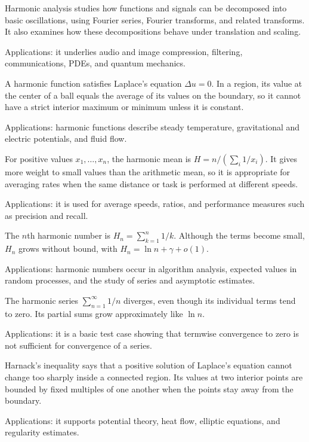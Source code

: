 Harmonic analysis studies how functions and signals can be decomposed into basic oscillations, using Fourier series, Fourier transforms, and related transforms. It also examines how these decompositions behave under translation and scaling. \par\noindent Applications: it underlies audio and image compression, filtering, communications, PDEs, and quantum mechanics.

A harmonic function satisfies Laplace's equation $\Delta u=0$. In a region, its value at the center of a ball equals the average of its values on the boundary, so it cannot have a strict interior maximum or minimum unless it is constant. \par\noindent Applications: harmonic functions describe steady temperature, gravitational and electric potentials, and fluid flow.

For positive values $x_1,\ldots,x_n$, the harmonic mean is $H=n/(\sum_i1/x_i)$. It gives more weight to small values than the arithmetic mean, so it is appropriate for averaging rates when the same distance or task is performed at different speeds. \par\noindent Applications: it is used for average speeds, ratios, and performance measures such as precision and recall.

The $n$th harmonic number is $H_n=\sum_{k=1}^n1/k$. Although the terms become small, $H_n$ grows without bound, with $H_n=\ln n+\gamma+o(1)$. \par\noindent Applications: harmonic numbers occur in algorithm analysis, expected values in random processes, and the study of series and asymptotic estimates.

The harmonic series $\sum_{n=1}^{\infty}1/n$ diverges, even though its individual terms tend to zero. Its partial sums grow approximately like $\ln n$. \par\noindent Applications: it is a basic test case showing that termwise convergence to zero is not sufficient for convergence of a series.

Harnack's inequality says that a positive solution of Laplace's equation cannot change too sharply inside a connected region. Its values at two interior points are bounded by fixed multiples of one another when the points stay away from the boundary. \par\noindent Applications: it supports potential theory, heat flow, elliptic equations, and regularity estimates.

